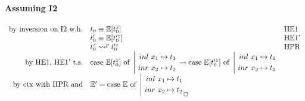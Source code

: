 \documentclass{article}
\newcommand{\inl}[0]{\ensuremath{\ inl\ }}
\newcommand{\inr}[0]{\ensuremath{\ inr\ }}
\newcommand{\case}[3]{\ensuremath{\text{case}#1\ \text{of}\ \left|\begin{aligned}#2\\#3\end{aligned}\right.}}
\newcommand{\mE}[0]{\ensuremath{\mathbb{E}}}
\begin{document}
\paragraph{Assuming I2}
\[
    \begin{array}{rl @{\quad} l}
        \text{by inversion on I2 w.h.}   &  t_0  \equiv \mE[t_0^z]         & \text{HE1}\\
                                         &  t_0' \equiv \mE[t_0'^z]        & \text{HE1'}\\
                                         &  t_0^z \leadsto^p t_0'^z     & \text{HPR}\\
        \text{by HE1, HE1' t.s.}         &  \case{\ \mE[t_0^z]}{\inl x_1 \mapsto t_1}{\inr x_2 \mapsto t_2} \leadsto \case{\ \mE[t_0'^z]}{\inl x_1 \mapsto t_1}{\inr x_2 \mapsto t_2} \\
        \text{by ctx with HPR and}       &  \mE' = \case{\ \mE}{\inl x_1 \mapsto t_1}{\inr x_2 \mapsto t_2} _\square \\
    \end{array}
\]
\end{document}
